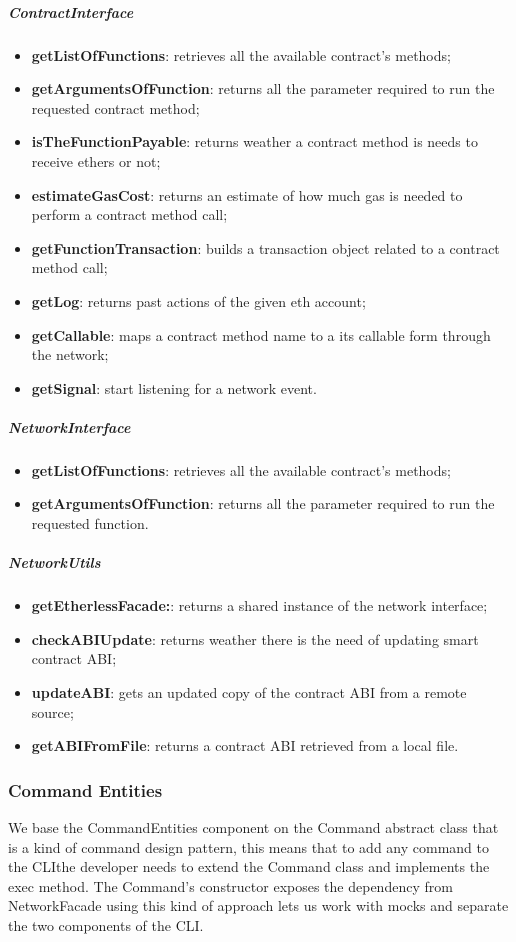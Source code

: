 \subparagraph{ContractInterface}
\begin{itemize}
    \item \textbf{getListOfFunctions}: retrieves all the available contract's methods;
    \item \textbf{getArgumentsOfFunction}: returns all the parameter required to run the requested contract method;
    \item \textbf{isTheFunctionPayable}: returns weather a contract method is needs to receive ethers or not;
    \item \textbf{estimateGasCost}: returns an estimate of how much gas is needed to perform a contract method call;
    \item \textbf{getFunctionTransaction}: builds a transaction object related to a contract method call;
    \item \textbf{getLog}: returns past actions of the given eth account;
    \item \textbf{getCallable}: maps a contract method name to a its callable form through the network;
    \item \textbf{getSignal}: start listening for a network event.
\end{itemize}
\subparagraph{NetworkInterface}
\begin{itemize}
    \item \textbf{getListOfFunctions}: retrieves all the available contract's methods;
    \item \textbf{getArgumentsOfFunction}: returns all the parameter required to run the requested function.
\end{itemize}
\subparagraph{NetworkUtils}
\begin{itemize}
    \item \textbf{getEtherlessFacade:}: returns a shared instance of the network interface;
    \item \textbf{checkABIUpdate}: returns weather there is the need of updating smart contract ABI;
    \item \textbf{updateABI}: gets an updated copy of the contract ABI from a remote source;
    \item \textbf{getABIFromFile}: returns a contract ABI retrieved from a local file.
\end{itemize}
\newpage
\subsubsection{Command Entities}
We base the CommandEntities component on the Command abstract class that is a kind of command design pattern, this means that to add any command to the CLI\glo the developer needs to extend the Command class and implements the exec method.
The Command's constructor exposes the dependency from NetworkFacade using this kind of approach lets us work with mocks and separate the two components of the CLI\glo.
